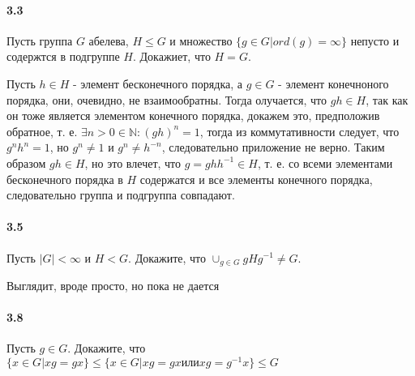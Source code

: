 \documentclass[a4paper,12pt]{article}
\begin{document}
\paragraph{3.3} Пусть группа $G$ абелева, $H \le G$ и множество $\{g \in G | ord(g) = \infty\}$ непусто и содержтся в подгруппе $H$. Докажиет, что $H=G$.

\begin{Solution}
Пусть $h \in H$ - элемент бесконечного порядка, а $g \in G$ - элемент конечноного порядка, они, очевидно, не взаимообратны. Тогда олучается, что $gh \in H$, так как он тоже является элементом конечного порядка, докажем это, предположив обратное, т. е. $\exists n > 0 \in \mathbb{N} : (gh)^n = 1$, тогда из коммутативности следует, что $g^n h^n = 1$, но $g^n \not= 1$ и $g^n \not= h^{-n}$, следовательно приложение не верно. Таким образом $gh \in H$, но это влечет, что $ g = gh h^{-1} \in H$, т. е. со всеми элементами бесконечного порядка в $H$ содержатся и все элементы конечного порядка, следовательно группа и подгруппа совпадают.
\end{Solution}

\paragraph{3.5} Пусть $|G| < \infty$ и $H < G$. Докажите, что $\cup_{g \in G} gHg^{-1} \not= G$.

\begin{Solution}
Выглядит, вроде просто, но пока не дается
\end{Solution}

\paragraph{3.8} Пусть $g \in G$. Докажите, что $\{x \in G | xg = gx\} \le \{x \in G | xg = gx \text{или} xg = g^{-1}x\} \le G$
\end{document}
